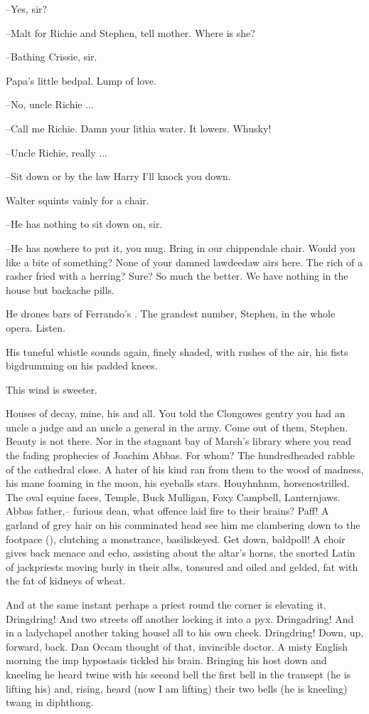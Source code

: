 --Yes, sir?

--Malt for Richie and Stephen, tell mother.
Where is she?

--Bathing Crissie, sir.

Papa's little bedpal.
Lump of love.

--No, uncle Richie ...

--Call me Richie.
Damn your lithia water.
It lowers.
Whusky!

--Uncle Richie, really ...

--Sit down or by the law Harry
I'll knock you down.

Walter squints vainly for a chair.

--He has nothing to sit down on, sir.

--He has nowhere to put it, you mug.
Bring in our chippendale chair.
Would you like a bite of something?
None of your damned lawdeedaw airs here.
The rich of a rasher fried with a herring?
Sure?
So much the better.
We have nothing in the house but backache pills.


He drones bars of Ferrando's .
The grandest number, Stephen,
in the whole opera.
Listen.

His tuneful whistle sounds again, finely shaded,
with rushes of the air,
his fists bigdrumming on his padded knees.

This wind is sweeter.

Houses of decay, mine, his and all.
You told the Clongowes gentry
you had an uncle a judge
and an uncle a general in the army.
Come out of them, Stephen.
Beauty is not there.
Nor in the stagnant bay of Marsh's library
where you read the fading prophecies of Joachim Abbas.
For whom?
The hundredheaded rabble of the cathedral close.
A hater of his kind ran from them to the wood of madness,
his mane foaming in the moon, his eyeballs stars.
Houyhnhnm, horsenostrilled.
The oval equine faces,
Temple, Buck Mulligan, Foxy Campbell, Lanternjaws.
Abbas father,--
furious dean, what offence laid fire to their brains?
Paff!
A garland of grey hair on his comminated head
see him me clambering down to the footpace (),
clutching a monstrance, basiliskeyed.
Get down, baldpoll!
A choir gives back menace and echo,
assisting about the altar's horns,
the snorted Latin of jackpriests
moving burly in their albs,
tonsured and oiled and gelded,
fat with the fat of kidneys of wheat.

And at the same instant
perhaps a priest round the corner is elevating it.
Dringdring!
And two streets off
another locking it into a pyx.
Dringadring!
And in a ladychapel
another taking housel all to his own cheek.
Dringdring!
Down, up, forward, back.
Dan Occam thought of that,
invincible doctor.
A misty English morning
the imp hypostasis tickled his brain.
Bringing his host down and kneeling
he heard twine with his second bell
the first bell in the transept
(he is lifting his)
and, rising, heard
(now I am lifting)
their two bells
(he is kneeling)
twang in diphthong.

